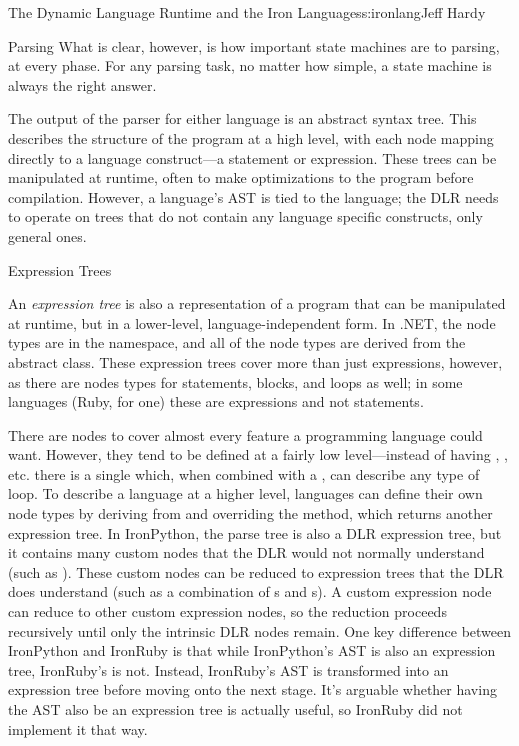 \begin{aosachapter}{The Dynamic Language Runtime and the Iron Languages}{s:ironlang}{Jeff Hardy}
\begin{aosasect1}{Parsing}
What is clear, however, is how important state machines are to
parsing, at every phase. For any parsing task, no matter how simple, a
state machine is always the right answer.

The output of the parser for either language is an abstract syntax
tree. This describes the structure of the program at a high level,
with each node mapping directly to a language construct---a statement
or expression.  These trees can be manipulated at runtime, often to
make optimizations to the program before compilation. However, a
language's AST is tied to the language; the DLR needs to operate on
trees that do not contain any language specific constructs, only
general ones.

\end{aosasect1}

\begin{aosasect1}{Expression Trees}

An \emph{expression tree} is also a representation of a program that
can be manipulated at runtime, but in a lower-level,
language-independent form. In .NET, the node types are in the
 namespace, and all of the node types
are derived from the abstract  class. These
expression trees cover more than just expressions, however, as there
are nodes types for  statements,  blocks, and loops
as well; in some languages (Ruby, for one) these are expressions and
not statements.

There are nodes to cover almost every feature a programming language
could want. However, they tend to be defined at a fairly low
level---instead of having ,
, etc. there is a single 
which, when combined with a , can describe any
type of loop. To describe a language at a higher level, languages can
define their own node types by deriving from  and
overriding the  method, which returns another
expression tree. In IronPython, the parse tree is also a DLR
expression tree, but it contains many custom nodes that the DLR would
not normally understand (such as ). These custom
nodes can be reduced to expression trees that the DLR does understand
(such as a combination of s and
s). A custom expression node can reduce to other
custom expression nodes, so the reduction proceeds recursively until
only the intrinsic DLR nodes remain. One key difference between
IronPython and IronRuby is that while IronPython's AST is also an
expression tree, IronRuby's is not. Instead, IronRuby's AST is
transformed into an expression tree before moving onto the next
stage. It's arguable whether having the AST also be an expression tree
is actually useful, so IronRuby did not implement it that way.


\end{aosasect1}
\end{aosachapter}
